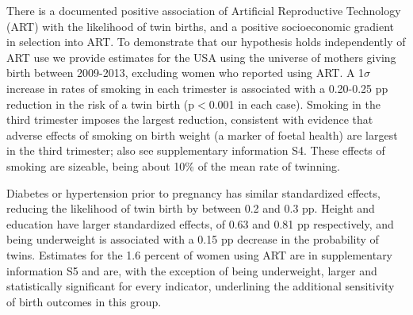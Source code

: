 \documentclass{nature}
\begin{document}
\begin{linenumbers}
There is a documented positive association of Artificial Reproductive Technology (ART) with the likelihood of twin births\cite{Vitthalaetal2009}, and a positive socioeconomic gradient in selection into ART. To demonstrate that our hypothesis holds independently of ART use we provide estimates for the USA using the universe of mothers giving birth between 2009-2013, excluding women who reported using ART. A 1$\sigma$ increase in rates of smoking in each trimester is associated with a 0.20-0.25 pp reduction in the risk of a twin birth (p$<$0.001 in each case). Smoking in the third trimester imposes the largest reduction, consistent with evidence that adverse effects of smoking on birth weight (a marker of foetal health) are largest in the third trimester\cite{Bernsteinetal2005}; also see supplementary information S4.  %
These effects of smoking are sizeable, being about 10\% of the mean rate of twinning. 

Diabetes or hypertension prior to pregnancy has similar standardized effects, reducing the likelihood of twin birth by between 0.2 and 0.3 pp. Height and education have larger standardized effects, of 0.63 and 0.81 pp respectively, and being underweight is associated with a 0.15 pp decrease in the probability of twins. Estimates for the 1.6 percent of women using ART are in supplementary information S5 and are, with the exception of being underweight, larger and statistically significant for every indicator, underlining the additional sensitivity of birth outcomes in this group.





\end{linenumbers}
\end{document}

